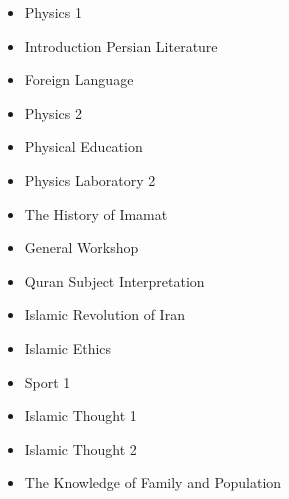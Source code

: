 \begin{itemize}
\item Physics 1
\item Introduction Persian Literature
\item Foreign Language
\item Physics 2
\item Physical Education
\item Physics Laboratory 2
\item The History of Imamat
\item General Workshop
\item Quran Subject Interpretation
\item Islamic Revolution of Iran
\item Islamic Ethics
\item Sport 1
\item Islamic Thought 1
\item Islamic Thought 2
\item The Knowledge of Family and Population
\end{itemize}